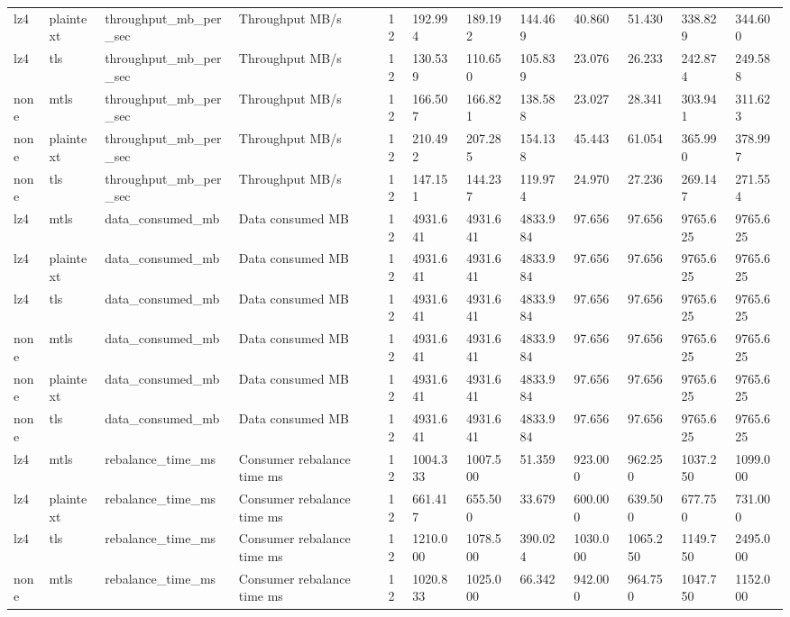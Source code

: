 \begin{longtable}{llllllllllll}
lz4 & plaintext & throughput\_mb\_per\_sec & Throughput MB/s & 12 & 192.994 & 189.192 & 144.469 & 40.860 & 51.430 & 338.829 & 344.600 \\
lz4 & tls & throughput\_mb\_per\_sec & Throughput MB/s & 12 & 130.539 & 110.650 & 105.839 & 23.076 & 26.233 & 242.874 & 249.588 \\
none & mtls & throughput\_mb\_per\_sec & Throughput MB/s & 12 & 166.507 & 166.821 & 138.588 & 23.027 & 28.341 & 303.941 & 311.623 \\
none & plaintext & throughput\_mb\_per\_sec & Throughput MB/s & 12 & 210.492 & 207.285 & 154.138 & 45.443 & 61.054 & 365.990 & 378.997 \\
none & tls & throughput\_mb\_per\_sec & Throughput MB/s & 12 & 147.151 & 144.237 & 119.974 & 24.970 & 27.236 & 269.147 & 271.554 \\
lz4 & mtls & data\_consumed\_mb & Data consumed MB & 12 & 4931.641 & 4931.641 & 4833.984 & 97.656 & 97.656 & 9765.625 & 9765.625 \\
lz4 & plaintext & data\_consumed\_mb & Data consumed MB & 12 & 4931.641 & 4931.641 & 4833.984 & 97.656 & 97.656 & 9765.625 & 9765.625 \\
lz4 & tls & data\_consumed\_mb & Data consumed MB & 12 & 4931.641 & 4931.641 & 4833.984 & 97.656 & 97.656 & 9765.625 & 9765.625 \\
none & mtls & data\_consumed\_mb & Data consumed MB & 12 & 4931.641 & 4931.641 & 4833.984 & 97.656 & 97.656 & 9765.625 & 9765.625 \\
none & plaintext & data\_consumed\_mb & Data consumed MB & 12 & 4931.641 & 4931.641 & 4833.984 & 97.656 & 97.656 & 9765.625 & 9765.625 \\
none & tls & data\_consumed\_mb & Data consumed MB & 12 & 4931.641 & 4931.641 & 4833.984 & 97.656 & 97.656 & 9765.625 & 9765.625 \\
lz4 & mtls & rebalance\_time\_ms & Consumer rebalance time ms & 12 & 1004.333 & 1007.500 & 51.359 & 923.000 & 962.250 & 1037.250 & 1099.000 \\
lz4 & plaintext & rebalance\_time\_ms & Consumer rebalance time ms & 12 & 661.417 & 655.500 & 33.679 & 600.000 & 639.500 & 677.750 & 731.000 \\
lz4 & tls & rebalance\_time\_ms & Consumer rebalance time ms & 12 & 1210.000 & 1078.500 & 390.024 & 1030.000 & 1065.250 & 1149.750 & 2495.000 \\
none & mtls & rebalance\_time\_ms & Consumer rebalance time ms & 12 & 1020.833 & 1025.000 & 66.342 & 942.000 & 964.750 & 1047.750 & 1152.000 \\

\end{longtable}

